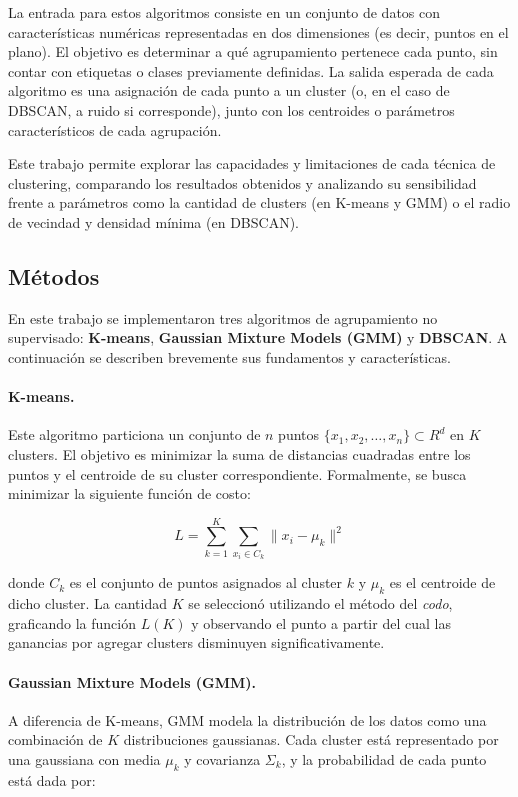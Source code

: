 \documentclass[11pt]{article}
\begin{document}
La entrada para estos algoritmos consiste en un conjunto de datos con características numéricas representadas en dos dimensiones (es decir, puntos en el plano). El objetivo es determinar a qué agrupamiento pertenece cada punto, sin contar con etiquetas o clases previamente definidas. La salida esperada de cada algoritmo es una asignación de cada punto a un cluster (o, en el caso de DBSCAN, a ruido si corresponde), junto con los centroides o parámetros característicos de cada agrupación.

Este trabajo permite explorar las capacidades y limitaciones de cada técnica de clustering, comparando los resultados obtenidos y analizando su sensibilidad frente a parámetros como la cantidad de clusters (en K-means y GMM) o el radio de vecindad y densidad mínima (en DBSCAN).

\subsection{Métodos}

En este trabajo se implementaron tres algoritmos de agrupamiento no supervisado: \textbf{K-means}, \textbf{Gaussian Mixture Models (GMM)} y \textbf{DBSCAN}. A continuación se describen brevemente sus fundamentos y características.

\paragraph{K-means.} Este algoritmo particiona un conjunto de $n$ puntos $\{x_1, x_2, \dots, x_n\} \subset 
{R}^d$ en $K$ clusters. El objetivo es minimizar la suma de distancias cuadradas entre los puntos y el centroide de su cluster correspondiente. Formalmente, se busca minimizar la siguiente función de costo:

\[
L = \sum_{k=1}^{K} \sum_{x_i \in C_k} \|x_i - \mu_k\|^2
\]

donde $C_k$ es el conjunto de puntos asignados al cluster $k$ y $\mu_k$ es el centroide de dicho cluster. La cantidad $K$ se seleccionó utilizando el método del \textit{codo}, graficando la función $L(K)$ y observando el punto a partir del cual las ganancias por agregar clusters disminuyen significativamente.

\paragraph{Gaussian Mixture Models (GMM).} A diferencia de K-means, GMM modela la distribución de los datos como una combinación de $K$ distribuciones gaussianas. Cada cluster está representado por una gaussiana con media $\mu_k$ y covarianza $\Sigma_k$, y la probabilidad de cada punto está dada por:
\end{document}
